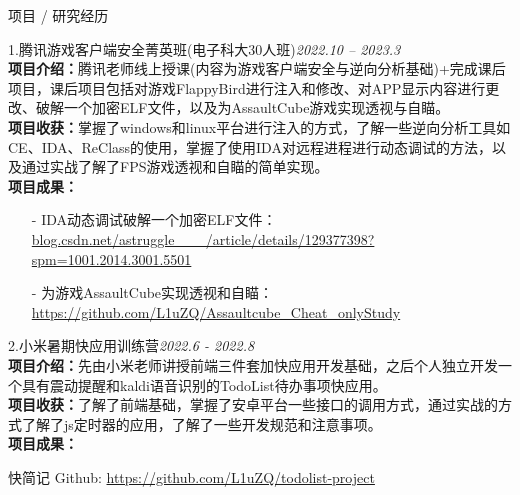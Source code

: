 \documentclass{resume} %
\begin{document}
\begin{rSection}{项目 / 研究经历}
\begin{rSubsection}{1.腾讯游戏客户端安全菁英班(电子科大30人班)}{\em 2022.10 – 2023.3} \\
{\textbf{项目介绍：}腾讯老师线上授课(内容为游戏客户端安全与逆向分析基础)+完成课后项目，课后项目包括对游戏FlappyBird进行注入和修改、对APP显示内容进行更改、破解一个加密ELF文件，以及为AssaultCube游戏实现透视与自瞄。} \\
{\textbf{项目收获：}掌握了windows和linux平台进行注入的方式，了解一些逆向分析工具如CE、IDA、ReClass的使用，掌握了使用IDA对远程进程进行动态调试的方法，以及通过实战了解了FPS游戏透视和自瞄的简单实现。} \\
{\textbf{项目成果：}} 
\item[]
\begin{itemize}
\setlength\itemsep{-0.5em}
\item[-] IDA动态调试破解一个加密ELF文件： \rm \url{blog.csdn.net/astruggle___/article/details/129377398?spm=1001.2014.3001.5501}
\item[-] 为游戏AssaultCube实现透视和自瞄： \rm \url{https://github.com/L1uZQ/Assaultcube_Cheat_onlyStudy}
\end{itemize}
\end{rSubsection}


\begin{rSubsection}{2.小米暑期快应用训练营}{\em 2022.6 - 2022.8} \\
{\textbf{项目介绍：}先由小米老师讲授前端三件套加快应用开发基础，之后个人独立开发一个具有震动提醒和kaldi语音识别的TodoList待办事项快应用。} \\
{\textbf{项目收获：}了解了前端基础，掌握了安卓平台一些接口的调用方式，通过实战的方式了解了js定时器的应用，了解了一些开发规范和注意事项。} \\
{\textbf{项目成果：}} 


快简记 Github: \rm \url{https://github.com/L1uZQ/todolist-project}
\end{rSubsection}





\end{rSection}
\end{document}

